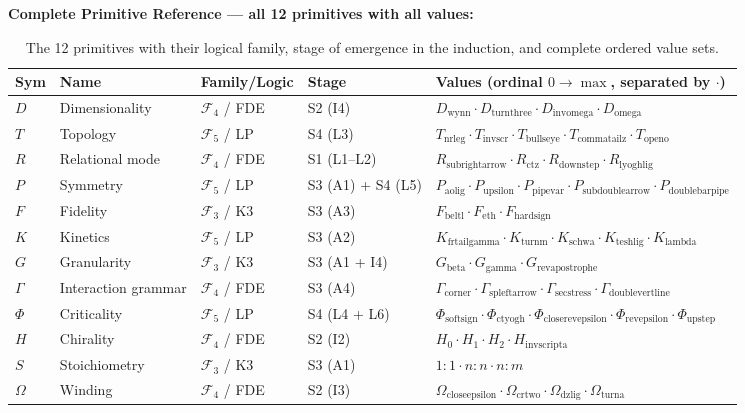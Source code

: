 \documentclass[12pt,a4paper]{article}
\begin{document}
\textbf{Complete Primitive Reference --- all 12 primitives with all values:}
\begin{table}[htbp]
\centering
\small
{}
\begin{tabular}{>{\centering\arraybackslash}p{0.5cm} >{\centering\arraybackslash}p{2.5cm} >{\centering\arraybackslash}p{1.9cm} >{\centering\arraybackslash}p{1.4cm} >{\raggedright\arraybackslash}p{7.8cm}}
\toprule
\rowcolor{gray!25}\textbf{Sym} & \textbf{Name} & \textbf{Family/Logic} & \textbf{Stage} & \textbf{Values (ordinal $0 \to \max$, separated by $\cdot$)} \\
\midrule
\rowcolors{1}{white}{gray!10}
$D$ & Dimensionality & $\mathcal{F}_4$ / FDE & S2 (I4) & $D_{\text{wynn}} \cdot D_{\text{turnthree}} \cdot D_{\text{invomega}} \cdot D_{\text{omega}}$ \\
$T$ & Topology & $\mathcal{F}_5$ / LP & S4 (L3) & $T_{\text{nrleg}} \cdot T_{\text{invscr}} \cdot T_{\text{bullseye}} \cdot T_{\text{commatailz}} \cdot T_{\text{openo}}$ \\
$R$ & Relational mode & $\mathcal{F}_4$ / FDE & S1 (L1--L2) & $R_{\text{subrightarrow}} \cdot R_{\text{ctz}} \cdot R_{\text{downstep}} \cdot R_{\text{lyoghlig}}$ \\
$P$ & Symmetry & $\mathcal{F}_5$ / LP & S3 (A1) + S4 (L5) & $P_{\text{aolig}} \cdot P_{\text{upsilon}} \cdot P_{\text{pipevar}} \cdot P_{\text{subdoublearrow}} \cdot P_{\text{doublebarpipe}}$ \\
$F$ & Fidelity & $\mathcal{F}_3$ / K3 & S3 (A3) & $F_{\text{beltl}} \cdot F_\text{eth} \cdot F_{\text{hardsign}}$ \\
$K$ & Kinetics & $\mathcal{F}_5$ / LP & S3 (A2) & $K_{\text{frtailgamma}} \cdot K_{\text{turnm}} \cdot K_{\text{schwa}} \cdot K_{\text{teshlig}} \cdot K_{\text{lambda}}$ \\
$G$ & Granularity & $\mathcal{F}_3$ / K3 & S3 (A1 + I4) & $G_{\text{beta}} \cdot G_{\text{gamma}} \cdot G_{\text{revapostrophe}}$ \\
$\Gamma$ & Interaction grammar & $\mathcal{F}_4$ / FDE & S3 (A4) & $\Gamma_{\text{corner}} \cdot \Gamma_{\text{spleftarrow}} \cdot \Gamma_{\text{secstress}} \cdot \Gamma_{\text{doublevertline}}$ \\
$\Phi$ & Criticality & $\mathcal{F}_5$ / LP & S4 (L4 + L6) & $\Phi_{\text{softsign}} \cdot \Phi_{\text{ctyogh}} \cdot \Phi_{\text{closerevepsilon}} \cdot \Phi_{\text{revepsilon}} \cdot \Phi_{\text{upstep}}$ \\
$H$ & Chirality & $\mathcal{F}_4$ / FDE & S2 (I2) & $H_0 \cdot H_1 \cdot H_2 \cdot H_{\text{invscripta}}$ \\
$S$ & Stoichiometry & $\mathcal{F}_3$ / K3 & S3 (A1) & $1{:}1 \cdot n{:}n \cdot n{:}m$ \\
$\Omega$ & Winding & $\mathcal{F}_4$ / FDE & S2 (I3) & $\Omega_{\text{closeepsilon}} \cdot \Omega_{\text{crtwo}} \cdot \Omega_{\text{dzlig}} \cdot \Omega_{\text{turna}}$ \\
\bottomrule
\end{tabular}
\caption{The 12 primitives with their logical family, stage of emergence in the induction, and complete ordered value sets.}
\label{tab:primitive-reference}
\end{table}
\end{document}
